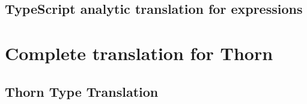 \documentclass[acmlarge, anonymous, authordraft]{acmart}
\begin{document}
\subsection{TypeScript analytic translation for expressions}


\colorbox[gray]{1}{
\begin{minipage}{\textwidth}
\begin{mathpar}


\end{mathpar}
\end{minipage}
}


\section{Complete translation for Thorn}

\subsection{Thorn Type Translation}
\end{document}
